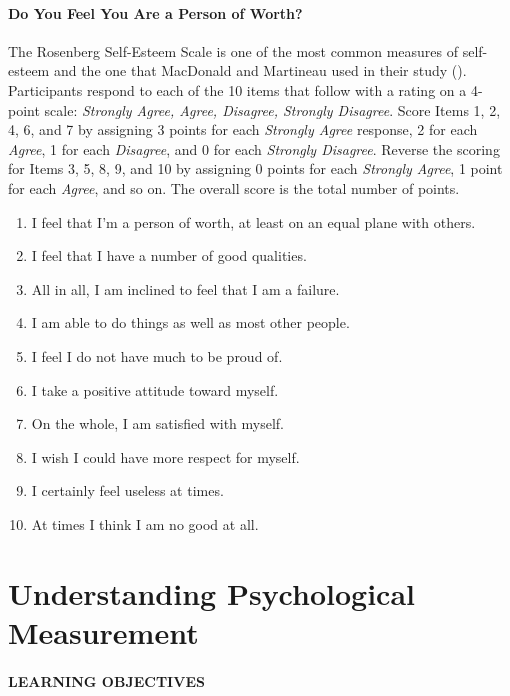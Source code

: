 \documentclass[
]{krantz}
\providecommand{\tightlist}{%
  \setlength{\itemsep}{0pt}\setlength{\parskip}{0pt}}
\begin{document}
\paragraph*{Do You Feel You Are a Person of Worth?}\label{do-you-feel-you-are-a-person-of-worth}

The Rosenberg Self-Esteem Scale is one of the most common measures of self-esteem and the one that MacDonald and Martineau used in their study (). Participants respond to each of the 10 items that follow with a rating on a 4-point scale: \emph{Strongly Agree, Agree, Disagree, Strongly Disagree}. Score Items 1, 2, 4, 6, and 7 by assigning 3 points for each \emph{Strongly Agree} response, 2 for each \emph{Agree}, 1 for each \emph{Disagree}, and 0 for each \emph{Strongly Disagree}. Reverse the scoring for Items 3, 5, 8, 9, and 10 by assigning 0 points for each \emph{Strongly Agree}, 1 point for each \emph{Agree}, and so on. The overall score is the total number of points.

\begin{enumerate}
\def\labelenumi{\arabic{enumi}.}
\tightlist
\item
  I feel that I'm a person of worth, at least on an equal plane with others.
\item
  I feel that I have a number of good qualities.
\item
  All in all, I am inclined to feel that I am a failure.
\item
  I am able to do things as well as most other people.
\item
  I feel I do not have much to be proud of.
\item
  I take a positive attitude toward myself.
\item
  On the whole, I am satisfied with myself.
\item
  I wish I could have more respect for myself.
\item
  I certainly feel useless at times.
\item
  At times I think I am no good at all.
\end{enumerate}

\section{Understanding Psychological Measurement}\label{understanding-psychological-measurement}

\paragraph*{LEARNING OBJECTIVES}\label{learning-objectives-9}
\end{document}

